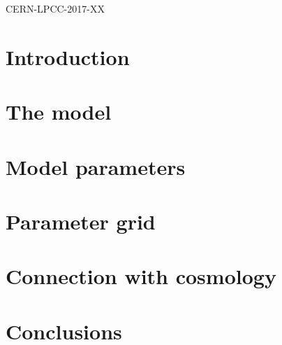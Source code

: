 \documentclass[a4paper, 11pt,notoc]{article}
\begin{document}





\hfill CERN-LPCC-2017-XX


\maketitle


\section{Introduction}


\section{The model}


\section{Model parameters}


\section{Parameter grid}


\section{Connection with cosmology}



\section{Conclusions}
\end{document}
